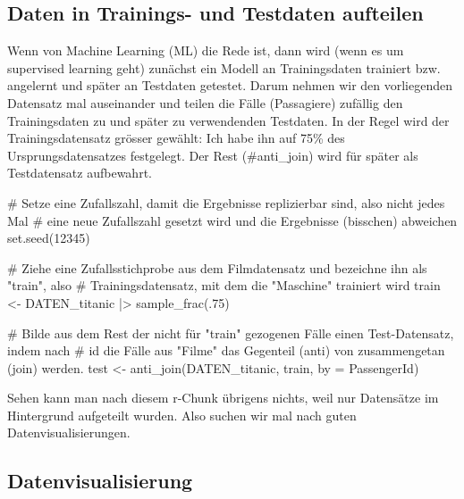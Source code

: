 \documentclass[
  10pt,
  letterpaper,
  a4paper, twoside]{scrreprt}
\newenvironment{Shaded}{\begin{snugshade}}{\end{snugshade}}
\newcommand{\AttributeTok}[1]{\textcolor[rgb]{0.40,0.45,0.13}{#1}}
\newcommand{\CommentTok}[1]{\textcolor[rgb]{0.37,0.37,0.37}{#1}}
\newcommand{\DecValTok}[1]{\textcolor[rgb]{0.68,0.00,0.00}{#1}}
\newcommand{\FunctionTok}[1]{\textcolor[rgb]{0.28,0.35,0.67}{#1}}
\newcommand{\NormalTok}[1]{\textcolor[rgb]{0.00,0.23,0.31}{#1}}
\newcommand{\OtherTok}[1]{\textcolor[rgb]{0.00,0.23,0.31}{#1}}
\newcommand{\SpecialCharTok}[1]{\textcolor[rgb]{0.37,0.37,0.37}{#1}}
\newcommand{\StringTok}[1]{\textcolor[rgb]{0.13,0.47,0.30}{#1}}
\begin{document}
\subsection{Daten in Trainings- und Testdaten
aufteilen}\label{daten-in-trainings--und-testdaten-aufteilen}

Wenn von Machine Learning (ML) die Rede ist, dann wird (wenn es um
supervised learning geht) zunächst ein Modell an Trainingsdaten
trainiert bzw. angelernt und später an Testdaten getestet. Darum nehmen
wir den vorliegenden Datensatz mal auseinander und teilen die Fälle
(Passagiere) zufällig den Trainingsdaten zu und später zu verwendenden
Testdaten. In der Regel wird der Trainingsdatensatz grösser gewählt: Ich
habe ihn auf 75\% des Ursprungsdatensatzes festgelegt. Der Rest
(\#anti\_join) wird für später als Testdatensatz aufbewahrt.

\begin{Shaded}
\begin{Highlighting}[]
\CommentTok{\# Setze eine Zufallszahl, damit die Ergebnisse replizierbar sind, also nicht jedes Mal}
\CommentTok{\# eine neue Zufallszahl gesetzt wird und die Ergebnisse (bisschen) abweichen}
\FunctionTok{set.seed}\NormalTok{(}\DecValTok{12345}\NormalTok{)}

\CommentTok{\# Ziehe eine Zufallsstichprobe aus dem Filmdatensatz und bezeichne ihn als "train", also }
\CommentTok{\# Trainingsdatensatz, mit dem die "Maschine" trainiert wird}
\NormalTok{train }\OtherTok{\textless{}{-}}\NormalTok{ DATEN\_titanic }\SpecialCharTok{|\textgreater{}} 
  \FunctionTok{sample\_frac}\NormalTok{(.}\DecValTok{75}\NormalTok{)}

\CommentTok{\# Bilde aus dem Rest der nicht für "train" gezogenen Fälle einen Test{-}Datensatz, indem nach}
\CommentTok{\# \textquotesingle{}id\textquotesingle{} die Fälle aus "Filme" das Gegenteil (anti) von zusammengetan (join) werden.}
\NormalTok{test  }\OtherTok{\textless{}{-}} \FunctionTok{anti\_join}\NormalTok{(DATEN\_titanic, train, }\AttributeTok{by =} \StringTok{\textquotesingle{}PassengerId\textquotesingle{}}\NormalTok{)}
\end{Highlighting}
\end{Shaded}

Sehen kann man nach diesem r-Chunk übrigens nichts, weil nur Datensätze
im Hintergrund aufgeteilt wurden. Also suchen wir mal nach guten
Datenvisualisierungen.

\subsection{Datenvisualisierung}\label{datenvisualisierung}
\end{document}
